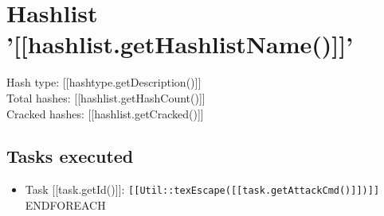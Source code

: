 \documentclass[12pt]{article}
\begin{document}
\section*{Hashlist '[[hashlist.getHashlistName()]]'}

Hash type: [[hashtype.getDescription()]]\\
Total hashes: [[hashlist.getHashCount()]]\\
Cracked hashes: [[hashlist.getCracked()]]\\

\subsection*{Tasks executed}

\begin{itemize}
{{FOREACH task;[[tasks]]}}
	\item Task [[task.getId()]]: \texttt{[[Util::texEscape([[task.getAttackCmd()]])]]}
{{ENDFOREACH}}
\end{itemize}
\end{document}
